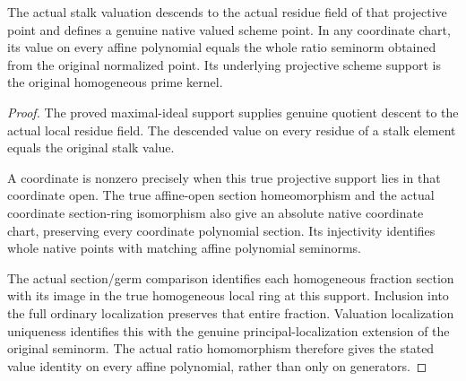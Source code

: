 \begin{theorem}
\label{projective:normalized-native-residue-values}
\leanok
{}
The actual stalk valuation descends to the actual residue field of that
projective point and defines a genuine native valued scheme point. In
any coordinate chart, its value on every affine polynomial equals the
whole ratio seminorm obtained from the original normalized point.
Its underlying projective scheme support is the original homogeneous
prime kernel.
\end{theorem}
\begin{proof}
The proved maximal-ideal support supplies genuine quotient descent to the
actual local residue field. The descended value on every residue of a
stalk element equals the original stalk value.

A coordinate is nonzero precisely when this true projective support lies
in that coordinate open. The true affine-open section homeomorphism and the actual coordinate
section-ring isomorphism also give an absolute native coordinate chart,
preserving every coordinate polynomial section. Its injectivity identifies
whole native points with matching affine polynomial seminorms.

The actual section/germ comparison identifies
each homogeneous fraction section with its image in the true homogeneous
local ring at this support. Inclusion into the full ordinary localization
preserves that entire fraction. Valuation localization uniqueness identifies
this with the genuine principal-localization extension of the original
seminorm. The actual ratio homomorphism therefore gives the stated value
identity on every affine polynomial, rather than only on generators.
\end{proof}


